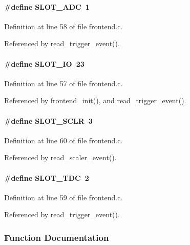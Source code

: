 \paragraph[{SLOT\_\-ADC}]{\setlength{\rightskip}{0pt plus 5cm}\#define SLOT\_\-ADC~1}\hfill\label{frontend_8c_a7564c312ba6e0dd2d261a487a397dc02}


Definition at line 58 of file frontend.c.

Referenced by read\_\-trigger\_\-event().
\paragraph[{SLOT\_\-IO}]{\setlength{\rightskip}{0pt plus 5cm}\#define SLOT\_\-IO~23}\hfill\label{frontend_8c_a8e6fbf3dae0479285c3f43bb5f604415}


Definition at line 57 of file frontend.c.

Referenced by frontend\_\-init(), and read\_\-trigger\_\-event().
\paragraph[{SLOT\_\-SCLR}]{\setlength{\rightskip}{0pt plus 5cm}\#define SLOT\_\-SCLR~3}\hfill\label{frontend_8c_a0da17be6dfbb480af4def8b02ca3e44d}


Definition at line 60 of file frontend.c.

Referenced by read\_\-scaler\_\-event().
\paragraph[{SLOT\_\-TDC}]{\setlength{\rightskip}{0pt plus 5cm}\#define SLOT\_\-TDC~2}\hfill\label{frontend_8c_a9929978eca96c0f4df0fd548ac65f70a}


Definition at line 59 of file frontend.c.

Referenced by read\_\-trigger\_\-event().

\subsubsection{Function Documentation}
